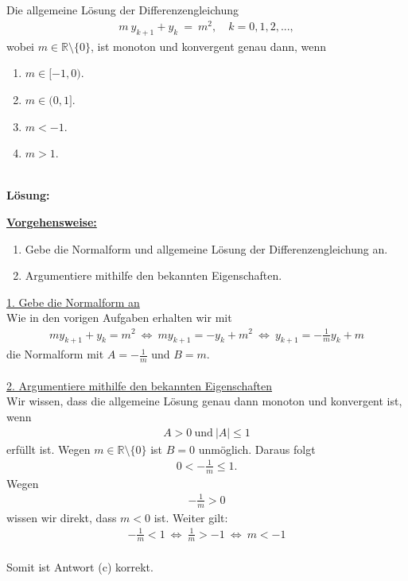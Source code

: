 \subsection*{}
Die allgemeine Lösung der Differenzengleichung
\begin{align*}
m \ y_{k+1} + y_k  \ = \ m^2, \quad k=0,1,2,...,
\end{align*}
wobei $m \in \mathbb{R} \setminus \lbrace 0 \rbrace$, ist monoton und konvergent genau dann, wenn
\renewcommand{\labelenumi}{(\alph{enumi})}
\begin{enumerate}
\item 
$m \in [-1,0)$.
\item
$m \in (0,1]$.
\item
$m < -1$.
\item
$m> 1$.
\end{enumerate}
\ \\
\textbf{Lösung:}
\begin{mdframed}
\underline{\textbf{Vorgehensweise:}}
\renewcommand{\labelenumi}{\theenumi.}
\begin{enumerate}
\item Gebe die Normalform und allgemeine Lösung der Differenzengleichung an.
\item 
Argumentiere mithilfe den bekannten Eigenschaften.
\end{enumerate}
\end{mdframed}

\underline{1. Gebe die Normalform an }\\
Wie in den vorigen Aufgaben erhalten wir mit
\begin{align*}
m  y_{k+1} + y_k   =  m^2
 \ \Leftrightarrow \
m y_{k+1} = - y_k + m^2
\ \Leftrightarrow \
y_{k+1} = - \frac{1}{m} y_k + m 
\end{align*}
die Normalform mit $A = - \frac{1}{m}$ und $B = m$.
\\
\\
\underline{2. Argumentiere mithilfe den bekannten Eigenschaften}\\
Wir wissen, dass die allgemeine Lösung genau dann monoton und konvergent ist, wenn
\begin{align*}
A > 0  \ \text{und} \ |A| \leq 1
\end{align*}
erfüllt ist.
Wegen $m \in \mathbb{R} \setminus \lbrace 0 \rbrace$ ist $B=0$ unmöglich.
Daraus folgt
\begin{align*}
0 < - \frac{1}{m} \leq 1. 
\end{align*}
Wegen 
\begin{align*}
-\frac{1}{m} > 0 
\end{align*}
wissen wir direkt, dass $m < 0 $ ist.
Weiter gilt:
\begin{align*}
- \frac{1}{m} < 1 
\ \Leftrightarrow \
\frac{1}{m} >-1
 \ \Leftrightarrow \
m < -1
\end{align*}
\\

Somit ist Antwort (c) korrekt.
